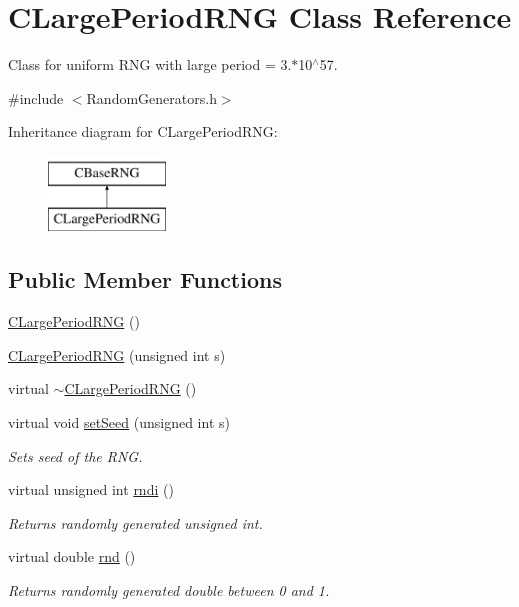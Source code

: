\hypertarget{class_c_large_period_r_n_g}{\section{C\-Large\-Period\-R\-N\-G Class Reference}
\label{class_c_large_period_r_n_g}
}


Class for uniform R\-N\-G with large period = 3.$\ast$10$^\wedge$57.  




{\ttfamily \#include $<$Random\-Generators.\-h$>$}

Inheritance diagram for C\-Large\-Period\-R\-N\-G\-:\begin{figure}[H]
\begin{center}
\leavevmode
\includegraphics[height=2.000000cm]{class_c_large_period_r_n_g}
\end{center}
\end{figure}
\subsection*{Public Member Functions}
\begin{DoxyCompactItemize}
\item 
\hyperlink{class_c_large_period_r_n_g_af8f1f4ec3712fa7f9534ea6e699913aa}{C\-Large\-Period\-R\-N\-G} ()
\item 
\hyperlink{class_c_large_period_r_n_g_ad70a60b7b4f77d25937360792954c78f}{C\-Large\-Period\-R\-N\-G} (unsigned int s)
\item 
virtual \hyperlink{class_c_large_period_r_n_g_a55def45c2c626bed84c1fd0ede1749f1}{$\sim$\-C\-Large\-Period\-R\-N\-G} ()
\item 
virtual void \hyperlink{class_c_large_period_r_n_g_a59d03465a293ce805a34339f409054d7}{set\-Seed} (unsigned int s)
\begin{DoxyCompactList}\small\item\em Sets seed of the R\-N\-G. \end{DoxyCompactList}\item 
virtual unsigned int \hyperlink{class_c_large_period_r_n_g_aadcf1849be317a7a4dc10500f168d8cd}{rndi} ()
\begin{DoxyCompactList}\small\item\em Returns randomly generated unsigned int. \end{DoxyCompactList}\item 
virtual double \hyperlink{class_c_large_period_r_n_g_a3666cfacb7c24934e7f578ed2b786eb2}{rnd} ()
\begin{DoxyCompactList}\small\item\em Returns randomly generated double between 0 and 1. \end{DoxyCompactList}\end{DoxyCompactItemize}
